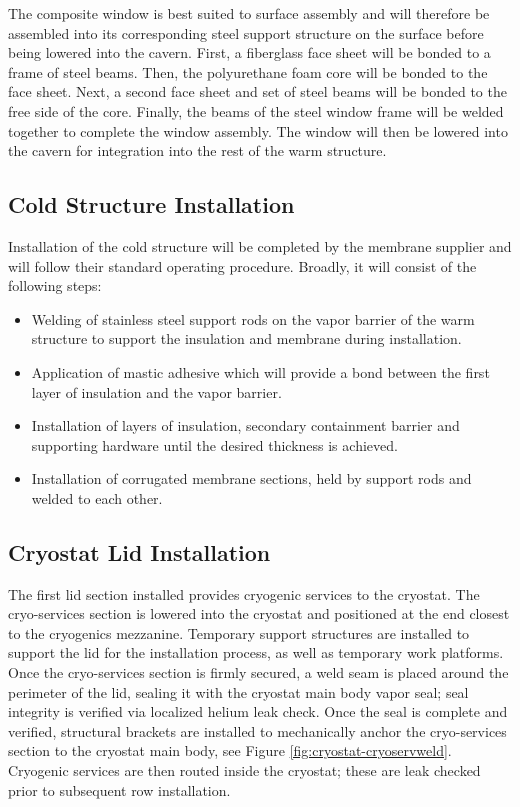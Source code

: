 The composite window is best suited to surface assembly and will therefore be assembled into its corresponding steel support structure on the surface before being lowered into the cavern. First, a fiberglass face sheet will be bonded to a frame of steel beams. Then, the polyurethane foam core will be bonded to the face sheet. Next, a second face sheet and set of steel beams will be bonded to the free side of the core. Finally, the beams of the steel window frame will be welded together to complete the window assembly. The window will then be lowered into the cavern for integration into the rest of the warm structure.

\subsection{Cold Structure Installation}
\label{sec:cryost-construc-cold}

Installation of the cold structure will be completed by the membrane supplier and will follow their standard operating procedure.  Broadly, it will consist of the following steps:

\begin {itemize}
\item Welding of stainless steel support rods on the vapor barrier of the warm structure to support the insulation and membrane during installation.
\item Application of mastic adhesive which will provide a bond between the first layer of insulation and the vapor barrier.
\item Installation of layers of insulation, secondary containment barrier and supporting hardware until the desired thickness is achieved.
\item Installation of corrugated membrane sections, held by support rods and welded to each other.
\end{itemize}

\subsection{ Cryostat Lid Installation}
\label{sec:cryost-construc-cold-lid}

The first lid section installed provides cryogenic services to the  cryostat.  The cryo-services section is lowered into the cryostat and positioned at the end closest to the cryogenics mezzanine.  Temporary support structures are installed to support the lid for the installation process, as well as temporary work platforms.  Once the cryo-services section is firmly secured, a weld seam is placed around the perimeter of the lid, sealing it with the cryostat main body vapor seal; seal integrity is verified via localized helium leak check.  Once the seal is complete and verified, structural brackets are installed to mechanically anchor the cryo-services section to the cryostat main body, see Figure \ref{fig:cryostat-cryoservweld}.  Cryogenic services are then routed inside the cryostat; these are leak checked prior to subsequent  row installation.

